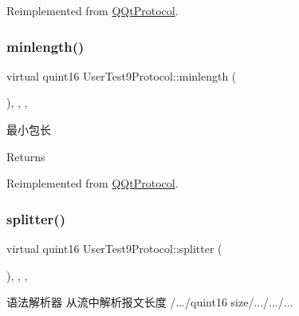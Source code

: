 Reimplemented from \mbox{\hyperlink{class_q_qt_protocol_af41bc3116abbbcfc9af45e151a253ff7}{Q\+Qt\+Protocol}}.

\mbox{\label{class_user_test9_protocol_a5f7538789e71e0111abe20cf99d93ca2}} 
\subsubsection{\texorpdfstring{minlength()}{minlength()}}
{\footnotesize\ttfamily virtual quint16 User\+Test9\+Protocol\+::minlength (\begin{DoxyParamCaption}{ }\end{DoxyParamCaption})\hspace{0.3cm}{\ttfamily [inline]}, {\ttfamily [override]}, {\ttfamily [protected]}, {\ttfamily [virtual]}}



最小包长 

\begin{DoxyReturn}{Returns}

\end{DoxyReturn}


Reimplemented from \mbox{\hyperlink{class_q_qt_protocol_a2b00f53d3dd0eed817eeecff422891f3}{Q\+Qt\+Protocol}}.

\mbox{\label{class_user_test9_protocol_ad2ecaec0fb0aa49ded69f3de5d994d3a}} 
\subsubsection{\texorpdfstring{splitter()}{splitter()}}
{\footnotesize\ttfamily virtual quint16 User\+Test9\+Protocol\+::splitter (\begin{DoxyParamCaption}\item[{const Q\+Byte\+Array \&}]{ }\end{DoxyParamCaption})\hspace{0.3cm}{\ttfamily [inline]}, {\ttfamily [override]}, {\ttfamily [protected]}, {\ttfamily [virtual]}}



语法解析器 从流中解析报文长度 /.../quint16 size/.../.../... 


